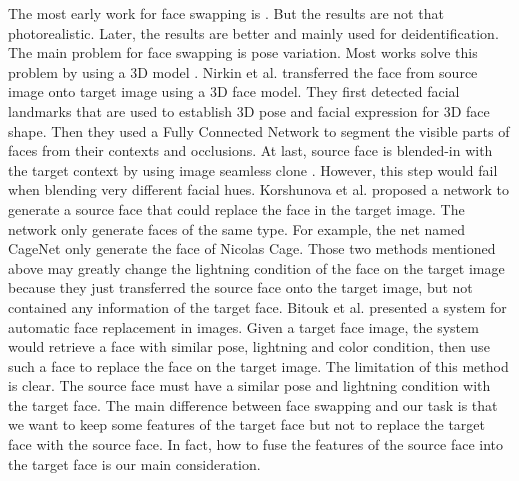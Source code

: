 The most early work for face swapping is \cite{exchface}. But the results are not that photorealistic. Later, the results are better \cite{de1}\cite{de2}\cite{de3}\cite{de4} and mainly used for deidentification. The main problem for face swapping is pose variation. Most works solve this problem by using a 3D model \cite{de3}\cite{3d1}\cite{onseg}. Nirkin et al. \cite{onseg} transferred the face from source image onto target image using a 3D face model. They first detected facial landmarks that are used to establish 3D pose and facial expression for 3D face shape. Then they used a Fully Connected Network to segment the visible parts of faces from their contexts and occlusions. At last, source face is blended-in with the target context by using image seamless clone \cite{pie}. However, this step would fail when blending very different facial hues. Korshunova et al. \cite{faceswapping} proposed a network to generate a source face that could replace the face in the target image. The network only generate faces of the same type. For example, the net named CageNet only generate the face of Nicolas Cage. Those two methods mentioned above may greatly change the lightning condition of the face on the target image because they just transferred the source face onto the target image, but not contained any information of the target face. Bitouk et al. \cite{autorep} presented a system for automatic  face replacement in images. Given a target face image, the system would retrieve a face with similar pose, lightning and color condition, then use such a face to replace the face on the target image. The limitation of this method is clear. The source face must have a similar pose and lightning condition with the target face. The main difference between face swapping and our task is that we want to keep some features of the target face but not to replace the target face with the source face. In fact, how to fuse the features of the source face into the target face is our main consideration. 